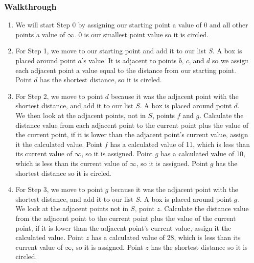 \documentclass{article}
\begin{document}
                \subsubsection{Walkthrough}
                \begin{enumerate}
                    \item We will start Step 0 by assigning our starting point a value of 0 and all other points a value of $\infty$. 0 is our smallest point value so it is circled.
                    
                    \item For Step 1, we move to our starting point and add it to our list $S$. A box is placed around point $a$'s value. It is adjacent to points $b$, $c$, and $d$ so we assign each adjacent point a value equal to the distance from our starting point. Point $d$ has the shortest distance, so it is circled.
                    
                    \item For Step 2, we move to point $d$ because it was the adjacent point with the shortest distance, and add it to our list $S$. A box is placed around point $d$. We then look at the adjacent points, not in $S$, points $f$ and $g$. Calculate the distance value from each adjacent point to the current point plus the value of the current point, if it is lower than the adjacent point's current value, assign it the calculated value. Point $f$ has a calculated value of 11, which is less than its current value of $\infty$, so it is assigned. Point $g$ has a calculated value of 10, which is less than its current value of $\infty$, so it is assigned. Point $g$ has the shortest distance so it is circled.
                    
                    \item For Step 3, we move to point $g$ because it was the adjacent point with the shortest distance, and add it to our list $S$. A box is placed around point $g$. We look at the adjacent points not in $S$, point $z$. Calculate the distance value from the adjacent point to the current point plus the value of the current point, if it is lower than the adjacent point's current value, assign it the calculated value. Point $z$ has a calculated value of 28, which is less than its current value of $\infty$, so it is assigned. Point $z$ has the shortest distance so it is circled.
                   

\end{enumerate}
\end{document}
